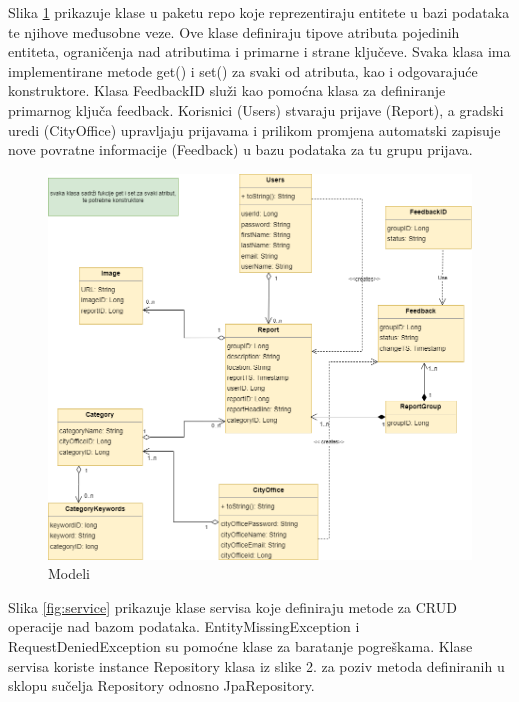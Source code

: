 			\eject
			
			Slika \ref{fig:repo} prikazuje klase u paketu repo koje reprezentiraju entitete u bazi podataka te njihove međusobne veze. Ove klase definiraju tipove atributa pojedinih entiteta, ograničenja nad atributima i primarne i strane ključeve. Svaka klasa ima implementirane metode get() i set() za svaki od atributa, kao i odgovarajuće konstruktore. Klasa FeedbackID služi kao pomoćna klasa za definiranje primarnog ključa feedback. Korisnici (Users) stvaraju prijave (Report), a gradski uredi (CityOffice) upravljaju prijavama i prilikom promjena automatski zapisuje nove povratne informacije (Feedback) u bazu podataka za tu grupu prijava.
			
			\begin{figure}[H]
				\includegraphics[width=\textwidth]{slike/repo.png} %
				\caption{Modeli}
				\label{fig:repo} %
			\end{figure}
			
			\eject
			
			Slika \ref{fig:service} prikazuje klase servisa koje definiraju metode za CRUD operacije nad bazom podataka. EntityMissingException i RequestDeniedException su pomoćne klase za baratanje pogreškama. Klase servisa koriste instance Repository klasa iz slike 2. za poziv metoda definiranih u sklopu sučelja Repository odnosno JpaRepository.
			
